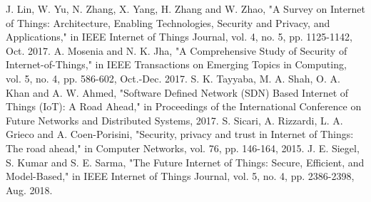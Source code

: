 \documentclass[conference]{IEEEtran}
\begin{document}
\begin{thebibliography}{00}
 J. Lin, W. Yu, N. Zhang, X. Yang, H. Zhang and W. Zhao, "A Survey on Internet of Things: Architecture, Enabling Technologies, Security and Privacy, and Applications," in IEEE Internet of Things Journal, vol. 4, no. 5, pp. 1125-1142, Oct. 2017.
 A. Mosenia and N. K. Jha, "A Comprehensive Study of Security of Internet-of-Things," in IEEE Transactions on Emerging Topics in Computing, vol. 5, no. 4, pp. 586-602, Oct.-Dec. 2017.
 S. K. Tayyaba, M. A. Shah, O. A. Khan and A. W. Ahmed, "Software Defined Network (SDN) Based Internet of Things (IoT): A Road Ahead," in Proceedings of the International Conference on Future Networks and Distributed Systems, 2017.
 S. Sicari, A. Rizzardi, L. A. Grieco and A. Coen-Porisini, "Security, privacy and trust in Internet of Things: The road ahead," in Computer Networks, vol. 76, pp. 146-164, 2015.
 J. E. Siegel, S. Kumar and S. E. Sarma, "The Future Internet of Things: Secure, Efficient, and Model-Based," in IEEE Internet of Things Journal, vol. 5, no. 4, pp. 2386-2398, Aug. 2018.
\end{thebibliography}
\end{document}
